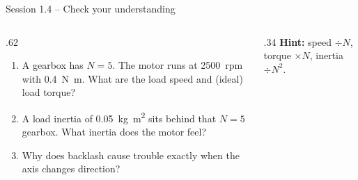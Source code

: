 \documentclass[aspectratio=169,10pt]{beamer}
\begin{document}
\begin{frame}{Session 1.4 -- Check your understanding}
\begin{columns}[T]
\begin{column}{.62\textwidth}
\begin{keybox}
\begin{enumerate}\setlength\itemsep{6pt}
\item A gearbox has $N=5$. The motor runs at \SI{2500}{rpm} with \SI{0.4}{\newton\metre}. What are the load speed and (ideal) load torque?
\item A load inertia of \SI{0.05}{\kilo\gram\metre\squared} sits behind that $N=5$ gearbox. What inertia does the motor feel?
\item Why does backlash cause trouble exactly when the axis changes direction?
\end{enumerate}
\end{keybox}
\end{column}
\begin{column}{.34\textwidth}
\small
\textbf{Hint:} speed $\div N$, torque $\times N$, inertia $\div N^2$.
\end{column}
\end{columns}
\end{frame}
\end{document}
